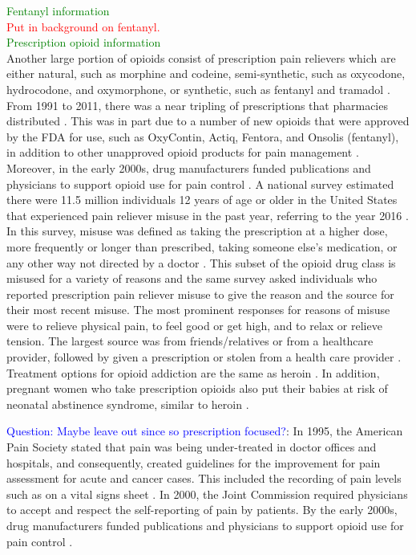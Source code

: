 \documentclass[12pt]{article}
\begin{document}
\textcolor{green}{Fentanyl information} \\
\textcolor{red}{Put in background on fentanyl.} \\

\textcolor{green}{Prescription opioid information} \\
Another large portion of opioids consist of prescription pain relievers which are either natural, such as morphine and codeine, semi-synthetic, such as oxycodone, hydrocodone, and oxymorphone, or synthetic, such as fentanyl and tramadol \cite{CDC3, TNMentalHealth2}. From 1991 to 2011, there was a near tripling of prescriptions that pharmacies distributed \cite{NIDA1}. This was in part due to a number of new opioids that were approved by the FDA for use, such as OxyContin, Actiq, Fentora, and Onsolis (fentanyl), in addition to other unapproved opioid products for pain management \cite{FDA1}. Moreover, in the early 2000s, drug manufacturers funded publications and physicians to support opioid use for pain control \cite{Mandell}. A national survey estimated there were 11.5 million individuals 12 years of age or older in the United States that experienced pain reliever misuse in the past year, referring to the year 2016 \cite{CDC2}. In this survey, misuse was defined as taking the prescription at a higher dose, more frequently or longer than prescribed, taking someone else's medication, or any other way not directed by a doctor \cite{SAMSHA3}. This subset of the opioid drug class is misused for a variety of reasons and the same survey asked individuals who reported prescription pain reliever misuse to give the reason and the source for their most recent misuse. The most prominent responses for reasons of misuse were to relieve physical pain, to feel good or get high, and to relax or relieve tension. The largest source was from friends/relatives or from a healthcare provider, followed by given a prescription or stolen from a health care provider \cite{CDC2}. Treatment options for opioid addiction are the same as heroin \cite{SAMSHA1}. In addition, pregnant women who take prescription opioids also put their babies at risk of neonatal abstinence syndrome, similar to heroin \cite{CDC5}. 

\textcolor{blue}{Question: Maybe leave out since so prescription focused?}: In 1995, the American Pain Society stated that pain was being under-treated in doctor offices and hospitals, and consequently, created guidelines for the improvement for pain assessment for acute and cancer cases. This included the recording of pain levels such as on a vital signs sheet \cite{Mandell, APSQCC}. In 2000, the Joint Commission required physicians to accept and respect the self-reporting of pain by patients. By the early 2000s, drug manufacturers funded publications and physicians to support opioid use for pain control \cite{Mandell}.  
\end{document}
